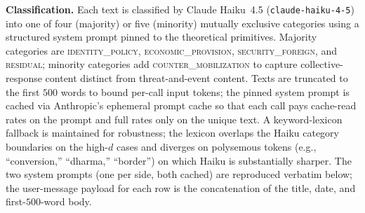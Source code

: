\documentclass[11pt,twoside]{extarticle}
\begin{document}
\textbf{Classification.} Each text is classified by Claude Haiku~4.5
(\texttt{claude-haiku-4-5}) into one of four (majority) or five (minority)
mutually exclusive categories using a structured system prompt pinned to the
theoretical primitives. Majority categories are \textsc{identity\_policy},
\textsc{economic\_provision}, \textsc{security\_foreign}, and
\textsc{residual}; minority categories add \textsc{counter\_mobilization}
to capture collective-response content distinct from threat-and-event
content. Texts are truncated to the first $500$ words to bound per-call
input tokens; the pinned system prompt is cached via Anthropic's ephemeral
prompt cache so that each call pays cache-read rates on the prompt and full
rates only on the unique text. A keyword-lexicon fallback is maintained for
robustness; the lexicon overlaps the Haiku category boundaries on the
high-$d$ cases and diverges on polysemous tokens (e.g., ``conversion,''
``dharma,'' ``border'') on which Haiku is substantially sharper. The two
system prompts (one per side, both cached) are reproduced verbatim below;
the user-message payload for each row is the concatenation of the title,
date, and first-$500$-word body.
\end{document}
